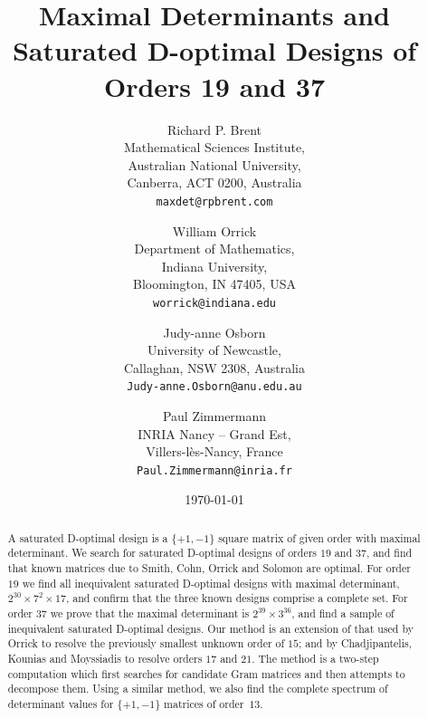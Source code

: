\documentclass[11pt,a4paper]{article}
\begin{document}


\title{Maximal Determinants and Saturated D-optimal Designs 
				of Orders 19 and 37}

\author{Richard P. Brent\\
Mathematical Sciences Institute,\\
Australian National University, \\
Canberra, ACT 0200, Australia\\
{\tt maxdet@rpbrent.com}
\and
William Orrick\\
Department of Mathematics,\\
Indiana University,\\
Bloomington, IN 47405, USA\\
{\tt worrick@indiana.edu}
\and 
Judy-anne Osborn\\
University of Newcastle,\\
Callaghan, NSW 2308, Australia\\
{\tt Judy-anne.Osborn@anu.edu.au}
\and 
Paul Zimmermann\\
INRIA Nancy -- Grand Est,\\ 
Villers-l\`es-Nancy, %
France\\
{\tt Paul.Zimmermann@inria.fr}
}

\date{\today}

\maketitle

\begin{abstract}
A saturated D-optimal design is a $\{+1,-1\}$ square matrix of given order
with maximal determinant.  We search for saturated D-optimal designs of
orders $19$ and $37$, and find that known matrices due to
Smith, Cohn, Orrick and Solomon are optimal.
For order $19$ we find all inequivalent saturated D-optimal
designs with maximal determinant, 
$2^{30}\times 7^2 \times 17$, %
and confirm
that the three known designs comprise a complete set.  For order $37$
we prove that the maximal determinant is 
$2^{39}\times 3^{36}$, %
and find a sample of inequivalent saturated D-optimal designs.
Our method is an
extension of that used by Orrick to resolve the previously smallest
unknown order of $15$; and by Chadjipantelis, Kounias and Moyssiadis
to resolve orders $17$ and $21$.
The method is a two-step computation which first searches
for candidate Gram matrices and then attempts to decompose them.
Using a similar method, 
we also find the complete spectrum of determinant values for
$\{+1,-1\}$ matrices of order~$13$.
\end{abstract}
\end{document}
